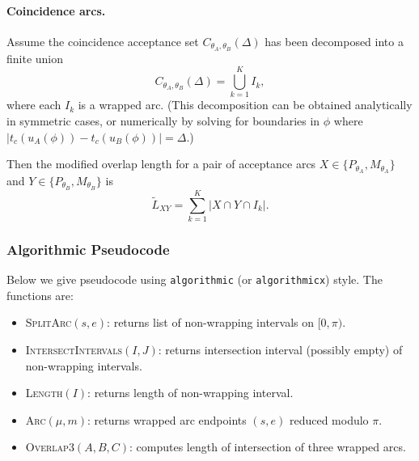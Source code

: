 \paragraph{Coincidence arcs.}
Assume the coincidence acceptance set $C_{\theta_A,\theta_B}(\Delta)$ has been decomposed into a finite union
\[
C_{\theta_A,\theta_B}(\Delta)=\bigcup_{k=1}^{K} I_k,
\]
where each $I_k$ is a wrapped arc. (This decomposition can be obtained analytically in symmetric cases,
or numerically by solving for boundaries in $\phi$ where
$|t_c(u_A(\phi))-t_c(u_B(\phi))|=\Delta$.)

Then the modified overlap length for a pair of acceptance arcs $X\in\{P_{\theta_A},M_{\theta_A}\}$ and
$Y\in\{P_{\theta_B},M_{\theta_B}\}$ is
\[
\tilde L_{XY}=\sum_{k=1}^{K} |X\cap Y\cap I_k|.
\]

\subsubsection*{Algorithmic Pseudocode}

Below we give pseudocode using \texttt{algorithmic} (or \texttt{algorithmicx}) style. The functions are:
\begin{itemize}
    \item \textsc{SplitArc}$(s,e)$: returns list of non-wrapping intervals on $[0,\pi)$.
    \item \textsc{IntersectIntervals}$(I,J)$: returns intersection interval (possibly empty) of non-wrapping intervals.
    \item \textsc{Length}$(I)$: returns length of non-wrapping interval.
    \item \textsc{Arc}$(\mu,m)$: returns wrapped arc endpoints $(s,e)$ reduced modulo $\pi$.
    \item \textsc{Overlap3}$(A,B,C)$: computes length of intersection of three wrapped arcs.
\end{itemize}

